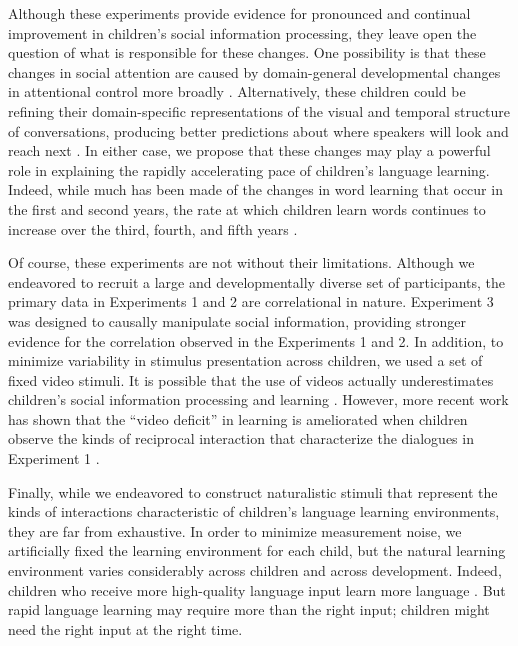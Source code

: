 \documentclass{pnastwo}
\begin{document}
\begin{article}
Although these experiments provide evidence for pronounced and continual improvement in children's social information processing, they leave open the question of what is responsible for these changes. One possibility is that these changes in social attention are caused by domain-general developmental changes in attentional control more broadly \citep{rueda2005,smith2013}. Alternatively, these children could be refining their domain-specific representations of the visual and temporal structure of conversations, producing better predictions about where speakers will look and reach next \citep{acheson2009,krogh-jespersen2015}. In either case, we propose that these changes may play a powerful role in explaining the rapidly accelerating pace of children's language learning. Indeed, while much has been made of the changes in word learning that occur in the first and second years, the rate at which children learn words continues to increase over the third, fourth, and fifth years \citep{bloom2000}.

Of course, these experiments are not without their limitations. Although we endeavored to recruit a large and developmentally diverse set of participants, the primary data in Experiments 1 and 2 are correlational in nature. Experiment 3 was designed to causally manipulate social information, providing stronger evidence for the correlation observed in the Experiments 1 and 2. In addition, to minimize variability in stimulus presentation across children, we used a set of fixed video stimuli. It is possible that the use of videos actually underestimates children's social information processing and learning \citep{anderson2005}. However, more recent work has shown that the ``video deficit'' in learning is ameliorated when children observe the kinds of reciprocal interaction that characterize the dialogues in Experiment 1  \citep{odoherty2011}.

Finally, while we endeavored to construct naturalistic stimuli that represent the kinds of interactions characteristic of children's language learning environments, they are far from exhaustive. In order to minimize measurement noise, we artificially fixed the learning environment for each child, but the natural learning environment varies considerably across children and across development. Indeed, children who receive more high-quality language input learn more language \citep{weisleder2013}. But rapid language learning may require more than the right input; children might need the right input at the right time.


\end{article}
\end{document}

